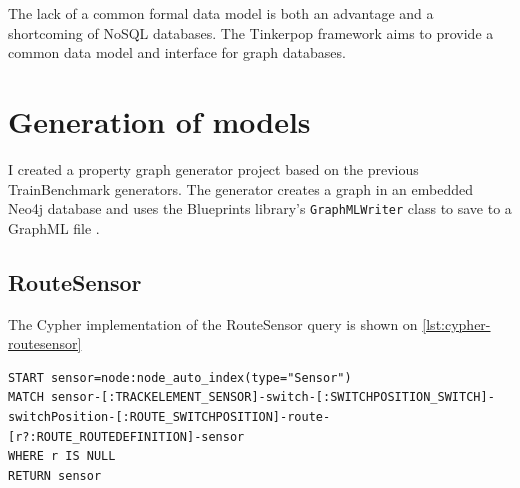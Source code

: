 The lack of a common formal data model is both an advantage and a shortcoming of NoSQL databases. The Tinkerpop framework \cite{Tinkerpop} aims to provide a common data model and interface for graph databases.

\section{Generation of models}

I created a property graph generator project based on the previous TrainBenchmark generators. The generator creates a graph in an embedded Neo4j database and uses the Blueprints library's \texttt{GraphMLWriter} class to save to a GraphML file \cite{Blueprints}.

\subsection{RouteSensor}

The Cypher implementation of the RouteSensor query is shown on \autoref{lst:cypher-routesensor}

\begin{lstlisting}[caption=Cyper query for the RouteSensor test case, label=lst:cypher-routesensor, breaklines=true]
START sensor=node:node_auto_index(type="Sensor")
MATCH sensor-[:TRACKELEMENT_SENSOR]-switch-[:SWITCHPOSITION_SWITCH]-switchPosition-[:ROUTE_SWITCHPOSITION]-route-[r?:ROUTE_ROUTEDEFINITION]-sensor
WHERE r IS NULL
RETURN sensor
\end{lstlisting}
